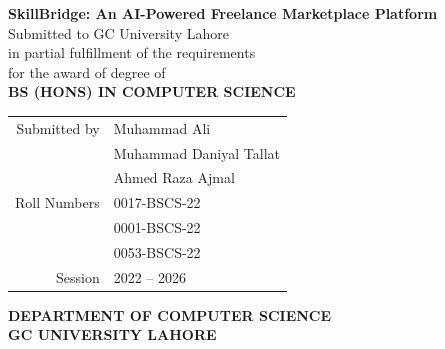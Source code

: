 \documentclass[12pt, oneside]{ThesisKazmi}
\begin{document}
\begin{titlepage}
\begin{center}

\vspace*{1.5cm}
{\fontsize{16}{20}\selectfont\bfseries\color{sbdark}
  SkillBridge: An AI-Powered Freelance Marketplace Platform}\\[1.5cm]

{\large Submitted to GC University Lahore\\[0.3cm]
in partial fulfillment of the requirements\\[0.3cm]
for the award of degree of}\\[1.5cm]

{\Large\bfseries\color{sbblue} BS (HONS) IN COMPUTER SCIENCE}\\[2cm]

{\large\bfseries\color{sbdark}
\begin{tabular}{r@{\quad:\quad}l}
  Submitted by  & Muhammad Ali \\[0.4ex]
                & Muhammad Daniyal Tallat \\[0.4ex]
                & Ahmed Raza Ajmal \\[0.8ex]
  Roll Numbers  & 0017-BSCS-22 \\[0.2ex]
                & 0001-BSCS-22 \\[0.2ex]
                & 0053-BSCS-22 \\[0.8ex]
  Session       & 2022 -- 2026 \\
\end{tabular}}

\vfill

{\Large\bfseries\color{sbdark} DEPARTMENT OF COMPUTER SCIENCE}\\[0.5cm]
{\Large\bfseries\color{sbdark} GC UNIVERSITY LAHORE}

\end{center}
\end{titlepage}

\clearpage
\end{document}
